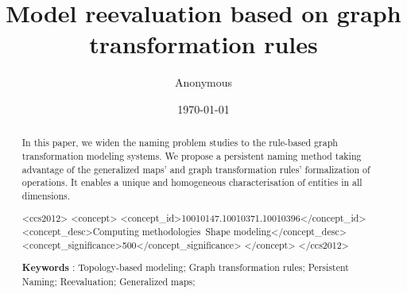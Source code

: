 \documentclass{egpubl}
\title{Model reevaluation based on graph transformation rules}
\author{Anonymous}
\date{\today}
\begin{document}
\maketitle


\begin{abstract}
In this paper, we widen the naming problem studies to the rule-based graph transformation modeling systems. 
We propose a persistent naming method taking advantage of the generalized maps' and graph transformation rules’ formalization of operations.
It enables a unique and homogeneous characterisation of entities in all dimensions.
\begin{CCSXML}
<ccs2012>
   <concept>
       <concept_id>10010147.10010371.10010396</concept_id>
       <concept_desc>Computing methodologies~Shape modeling</concept_desc>
       <concept_significance>500</concept_significance>
       </concept>
 </ccs2012>
\end{CCSXML}

\printccsdesc

\textbf{Keywords} : Topology-based modeling; Graph transformation rules; Persistent Naming; Reevaluation; Generalized maps;
\end{abstract}




\clearpage\newpage
\printbibliography
\end{document}
